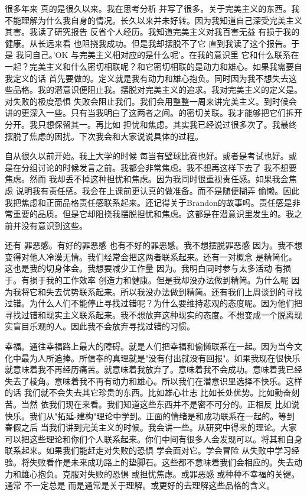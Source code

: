 很多年来 真的是很久以来。我在思考分析 并写了很多。关于完美主义的东西。我不能理解为什么我自身的情况。长久以来并未好转。因为我知道自己深受完美主义其害。我读了研究报告 反省个人经历。我知道完美主义对我百害无益 有损于我的健康。从长远来看 也阻挠我成功。但是我却摆脱不了它 直到我读了这个报告。于是 我问自己。'OK 与完美主义相对应的是什么呢'。在我的意识里 它和什么联系在一起？完美主义和什么密切相联呢？和它密切相联的是动力和雄心。如果我需要自我定义的话 首先要做的。定义就是我有动力和雄心抱负。同时因为我不想失去这些品格。我的潜意识便阻止我。摆脱对完美主义的追求。我对完美主义的定义是。对失败的极度恐惧 失败会阻止我们。我们会用整整一周来讲完美主义。到时候会讲的更深入一些。只有当我明白了这两者之间。的密切关联。我才能够把它们拆开 分开。我只想保留其一。再比如 担忧和焦虑。其实我已经说过很多次了。我最终摆脱了焦虑的困扰。下次我会和大家说说具体的过程。 

自从很久以前开始。我上大学的时候 每当有壁球比赛也好。或者是考试也好。或是在分组讨论的时候发言之前。我都会非常焦虑。我不想再这样下去了 我不想要焦虑。然而 我却丢不掉这种担忧和焦虑。因为我同时很重视责任感。如果我会焦虑 说明我有责任感。我会在上课前更认真的做准备。而不是随便糊弄 偷懒。因此我把焦虑和正面品格责任感联系起来。还记得关于Brandon的故事吗。责任感是非常重要的品质。但是它却阻挠我摆脱担忧和焦虑。这都是在潜意识里发生的。我之前并没有意识到这些。 

还有 罪恶感。有好的罪恶感 也有不好的罪恶感。我不想摆脱罪恶感 因为。我不想变得对他人冷漠无情。我们经常会把这两者联系起来。还有一对概念 是精简化。这也是我的切身体会。我想要减少工作量 因为。我明白同时参与太多活动 有损于。有损于我的工作效率 创造力和健康。但是我却没办法做到精简。为什么呢 因为我将它和失去优势联系起来。所以我没办法做到精简。还有我们上周谈到的寻找过错。为什么人们不能停止寻找过错呢？为什么要维持悲观的态度呢。因为他们把寻找过错和现实主义联系起来。我不想放弃这种现实的态度。不想变成一个脱离现实盲目乐观的人。因此我不会放弃寻找过错的习惯。 

幸福。通往幸福路上最大的障碍。就是人们把幸福和偷懒联系在一起。因为当今文化中最为人所追捧。所信奉的真理就是"没有付出就没有回报"。如果我现在很快乐 就意味着我不再经历痛苦。就意味着我放弃了。意味着我不会成功。意味着我已经失去了棱角。意味着我不再有动力和雄心。所以我们在潜意识里选择不快乐。这样的话 我们就不会失去其它珍贵的东西。比如雄心壮志 比如长处优势。比如勤奋刻苦。当然 依我们现在来看。我们知道这些东西并不是密不可分的。正相反 比如说 快乐。我们从"拓延-建构"理论中学到。正面的情绪是和成功联系在一起的。等到春假之后 当我们讲到完美主义的时候。我会讲一些。从研究中得来的理论。大家可以把这些理论和你们个人联系起来。你们中间有很多人会发现可以。将其和自身联系起来。如果我们能赶走对失败的恐惧 学会面对它。学会冒险 从失败中学习经验。将失败看作是未来成功路上的垫脚石。这些都不意味着我们会相应的。失去动力和雄心抱负。克服对失败的恐惧 或担忧焦虑。或罪恶感 或种种不幸福的关键。通常 不一定总是 而是通常是关于理解。或更好的去理解这些品格的含义。 

